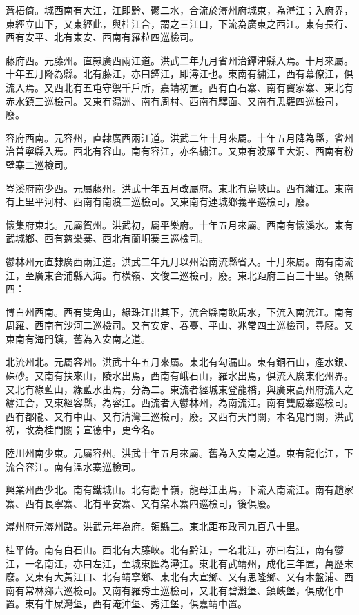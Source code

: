 蒼梧倚。城西南有大江，江即黔、鬱二水，合流於潯州府城東，為潯江；入府界，東經立山下，又東經此，與桂江合，謂之三江口，下流為廣東之西江。東有長行、西有安平、北有東安、西南有羅粒四巡檢司。

藤府西。元藤州。直隸廣西兩江道。洪武二年九月省州治鐔津縣入焉。十月來屬。十年五月降為縣。北有藤江，亦曰鐔江，即潯江也。東南有繡江，西有幕僚江，俱流入焉。又西北有五屯守禦千戶所，嘉靖初置。西有白石寨、南有竇家寨、東北有赤水鎮三巡檢司。又東有溻洲、南有周村、西南有驛面、又南有思羅四巡檢司，廢。

容府西南。元容州，直隸廣西兩江道。洪武二年十月來屬。十年五月降為縣，省州治普寧縣入焉。西北有容山。南有容江，亦名繡江。又東有波羅里大洞、西南有粉壁寨二巡檢司。

岑溪府南少西。元屬藤州。洪武十年五月改屬府。東北有烏峽山。西有繡江。東南有上里平河村、西南有南渡二巡檢司。又東南有連城鄉義平巡檢司，廢。

懷集府東北。元屬賀州。洪武初，屬平樂府。十年五月來屬。西南有懷溪水。東有武城鄉、西有慈樂寨、西北有蘭峒寨三巡檢司。

鬱林州元直隸廣西兩江道。洪武二年九月以州治南流縣省入。十月來屬。南有南流江，至廣東合浦縣入海。有橫嶺、文俊二巡檢司，廢。東北距府三百三十里。領縣四：

博白州西南。西有雙角山，綠珠江出其下，流合縣南飲馬水，下流入南流江。南有周羅、西南有沙河二巡檢司。又有安定、春臺、平山、兆常四土巡檢司，尋廢。又東南有海門鎮，舊為入安南之道。

北流州北。元屬容州。洪武十年五月來屬。東北有勾漏山。東有銅石山，產水銀、硃砂。又南有扶來山，陵水出焉，西南有峨石山，羅水出焉，俱流入廣東化州界。又北有綠藍山，綠藍水出焉，分為二。東流者經城東登龍橋，與廣東高州府流入之繡江合，又東經容縣，為容江。西流者入鬱林州，為南流江。南有雙威寨巡檢司。西有都隴、又有中山、又有清灣三巡檢司，廢。又西有天門關，本名鬼門關，洪武初，改為桂門關；宣德中，更今名。

陸川州南少東。元屬容州。洪武十年五月來屬。舊為入安南之道。東有龍化江，下流合容江。南有溫水寨巡檢司。

興業州西少北。南有鐵城山。北有翻車嶺，龍母江出焉，下流入南流江。南有趙家寨、西有長寧寨、北有平安寨、又有棠木寨四巡檢司，後俱廢。

潯州府元潯州路。洪武元年為府。領縣三。東北距布政司九百八十里。

桂平倚。南有白石山。西北有大藤峽。北有黔江，一名北江，亦曰右江，南有鬱江，一名南江，亦曰左江，至城東匯為潯江。東北有武靖州，成化三年置，萬歷末廢。又東有大黃江口、北有靖寧鄉、東北有大宣鄉、又有思隆鄉、又有木盤浦、西南有常林鄉六巡檢司。又南有羅秀土巡檢司，又北有碧灘堡、鎮峽堡，俱成化中置。東有牛屎灣堡，西有淹沖堡、秀江堡，俱嘉靖中置。

